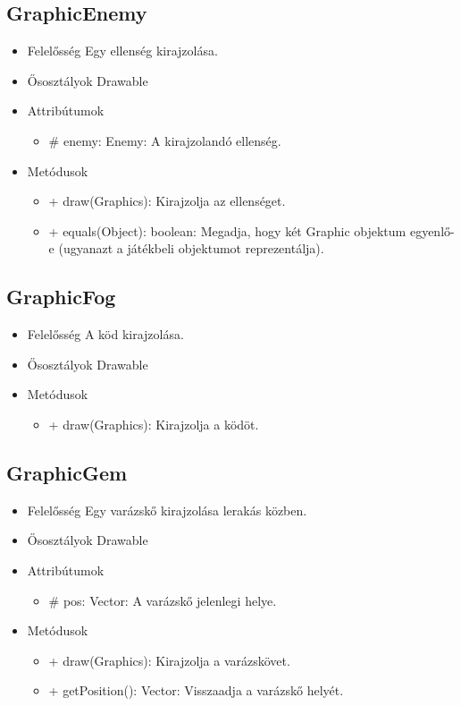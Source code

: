 \subsection{GraphicEnemy}
\begin{itemize}
\item Felelősség \newline
Egy ellenség kirajzolása.
\item Ősosztályok\newline
Drawable
\item Attribútumok
	\begin{itemize}
		\item \# enemy: Enemy: A kirajzolandó ellenség.
	\end{itemize}
\item Metódusok
	\begin{itemize}
		\item + draw(Graphics): Kirajzolja az ellenséget.
		\item + equals(Object): boolean: Megadja, hogy két Graphic objektum egyenlő-e (ugyanazt a játékbeli objektumot reprezentálja).
	\end{itemize}
\end{itemize}

\subsection{GraphicFog}
\begin{itemize}
\item Felelősség \newline
A köd kirajzolása.
\item Ősosztályok\newline
Drawable
\item Metódusok
	\begin{itemize}
		\item + draw(Graphics): Kirajzolja a ködöt.
	\end{itemize}
\end{itemize}

\subsection{GraphicGem}
\begin{itemize}
\item Felelősség \newline
Egy varázskő kirajzolása lerakás közben.
\item Ősosztályok \newline
Drawable
\item Attribútumok
	\begin{itemize}
		\item \# pos: Vector: A varázskő jelenlegi helye.
	\end{itemize}
\item Metódusok
	\begin{itemize}
		\item + draw(Graphics): Kirajzolja a varázskövet.
		\item + getPosition(): Vector: Visszaadja a varázskő helyét.
	\end{itemize}
\end{itemize}


